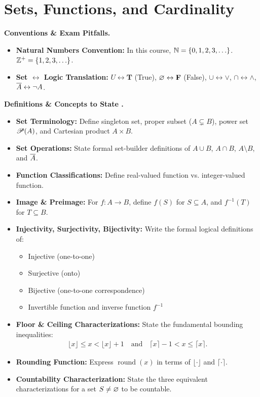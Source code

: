 \documentclass{natsirt}
\newcounter{topic}[section]
\newenvironment{recallbox}[1][]{%
    \begin{bluebox}[#1]\refstepcounter{topic}\textbf{Definitions \& Concepts to State \thesection.\thetopic}%
}{\end{bluebox}}
\newenvironment{warningbox}[1][]{\begin{whitebox}[#1]\textbf{Conventions \& Exam Pitfalls. }}{\end{whitebox}}
\newcommand{\citem}{\item[$\square$]}
\newcommand{\Tval}{\mathbf{T}}
\newcommand{\Fval}{\mathbf{F}}
\begin{document}
\section{Sets, Functions, and Cardinality}

\begin{warningbox}
    \begin{itemize}
        \citem \textbf{Natural Numbers Convention:} In this course, $\N = \set{0, 1, 2, 3, \dots}$. $\Z^+ = \set{1, 2, 3, \dots}$.
        \citem \textbf{Set $\leftrightarrow$ Logic Translation:} $U \leftrightarrow \Tval$ (True), $\emp \leftrightarrow \Fval$ (False), $\cup \leftrightarrow \lor$, $\cap \leftrightarrow \land$, $\overline{A} \leftrightarrow \neg A$.
    \end{itemize}
\end{warningbox}

\begin{recallbox}
    \begin{itemize}
        \citem \textbf{Set Terminology:} Define singleton set, proper subset ($A \subsetneq B$), power set $\mathscr{P}(A)$, and Cartesian product $A \times B$.
        \citem \textbf{Set Operations:} State formal set-builder definitions of $A \cup B$, $A \cap B$, $A \setminus B$, and $\overline{A}$.
        \citem \textbf{Function Classifications:} Define real-valued function vs. integer-valued function.
        \citem \textbf{Image \& Preimage:} For $f: A \to B$, define $f(S)$ for $S \subseteq A$, and $f^{-1}(T)$ for $T \subseteq B$.
        \citem \textbf{Injectivity, Surjectivity, Bijectivity:} Write the formal logical definitions of:
        \begin{itemize}
            \item Injective (one-to-one)
            \item Surjective (onto)
            \item Bijective (one-to-one correspondence)
            \item Invertible function and inverse function $f^{-1}$
        \end{itemize}
        \citem \textbf{Floor \& Ceiling Characterizations:} State the fundamental bounding inequalities:
        \begin{align*}
            \lfloor x \rfloor \le x < \lfloor x \rfloor + 1 \quad \text{and} \quad \lceil x \rceil - 1 < x \le \lceil x \rceil.
        \end{align*}
        \citem \textbf{Rounding Function:} Express $\operatorname{round}(x)$ in terms of $\lfloor \cdot \rfloor$ and $\lceil \cdot \rceil$.
        \citem \textbf{Countability Characterization:} State the three equivalent characterizations for a set $S \neq \varnothing$ to be countable.
    \end{itemize}
\end{recallbox}
\end{document}

